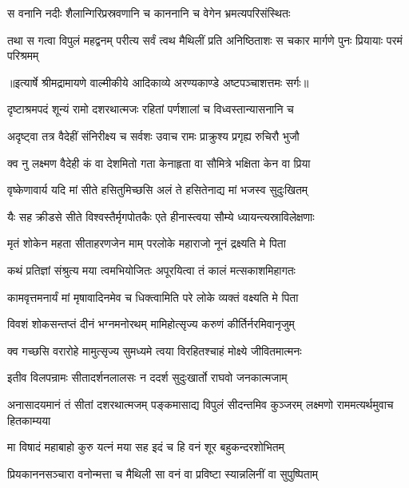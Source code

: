 \twolineshloka
{स वनानि नदीः शैलान्गिरिप्रस्रवणानि च}
{काननानि च वेगेन भ्रमत्यपरिसंस्थितः} %

\fourlineindentedshloka
{तथा स गत्वा विपुलं महद्वनम्}
{परीत्य सर्वं त्वथ मैथिलीं प्रति}
{अनिष्ठिताशः स चकार मार्गणे}
{पुनः प्रियायाः परमं परिश्रमम्} %


{॥इत्यार्षे श्रीमद्रामायणे वाल्मीकीये आदिकाव्ये अरण्यकाण्डे अष्टपञ्चाशत्तमः सर्गः॥}


\twolineshloka
{दृष्टाश्रमपदं शून्यं रामो दशरथात्मजः}
{रहितां पर्णशालां च विध्वस्तान्यासनानि च} %

\twolineshloka
{अदृष्ट्वा तत्र वैदेहीं संनिरीक्ष्य च सर्वशः}
{उवाच रामः प्राक्रुश्य प्रगृह्य रुचिरौ भुजौ} %

\twolineshloka
{क्व नु लक्ष्मण वैदेही कं वा देशमितो गता}
{केनाहृता वा सौमित्रे भक्षिता केन वा प्रिया} %

\twolineshloka
{वृष्केणावार्य यदि मां सीते हसितुमिच्छसि}
{अलं ते हसितेनाद्य मां भजस्व सुदुःखितम्} %

\twolineshloka
{यैः सह क्रीडसे सीते विश्वस्तैर्मृगपोतकैः}
{एते हीनास्त्वया सौम्ये ध्यायन्त्यस्राविलेक्षणाः} %

\twolineshloka
{मृतं शोकेन महता सीताहरणजेन माम्}
{परलोके महाराजो नूनं द्रक्ष्यति मे पिता} %

\twolineshloka
{कथं प्रतिज्ञां संश्रुत्य मया त्वमभियोजितः}
{अपूरयित्वा तं कालं मत्सकाशमिहागतः} %

\twolineshloka
{कामवृत्तमनार्यं मां मृषावादिनमेव च}
{धिक्त्वामिति परे लोके व्यक्तं वक्ष्यति मे पिता} %

\twolineshloka
{विवशं शोकसन्तप्तं दीनं भग्नमनोरथम्}
{मामिहोत्सृज्य करुणं कीर्तिर्नरमिवानृजुम्} %

\twolineshloka
{क्व गच्छसि वरारोहे मामुत्सृज्य सुमध्यमे}
{त्वया विरहितश्चाहं मोक्ष्ये जीवितमात्मनः} %

\twolineshloka
{इतीव विलपन्रामः सीतादर्शनलालसः}
{न ददर्श सुदुःखार्तो राघवो जनकात्मजाम्} %

\threelineshloka
{अनासादयमानं तं सीतां दशरथात्मजम्}
{पङ्कमासाद्य विपुलं सीदन्तमिव कुञ्जरम्}
{लक्ष्मणो राममत्यर्थमुवाच हितकाम्यया} %

\twolineshloka
{मा विषादं महाबाहो कुरु यत्नं मया सह}
{इदं च हि वनं शूर बहुकन्दरशोभितम्} %

\twolineshloka
{प्रियकाननसञ्चारा वनोन्मत्ता च मैथिली}
{सा वनं वा प्रविष्टा स्यान्नलिनीं वा सुपुष्पिताम्} %

